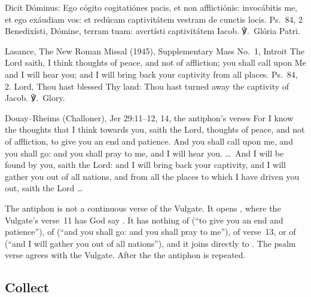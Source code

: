 
\begin{latinproper}
Dicit Dóminus: Ego cógito cogitatiónes pacis, et non afflictiónis:
invocábitis me, et ego exáudiam vos: et redúcam captivitátem vestram de
cunctis locis. \textnormal{Ps.\ 84, 2} Benedixísti, Dómine, terram tuam:
avertísti captivitátem Iacob. ℣.~Glória Patri.
\end{latinproper}

\begin{englishwitness}{Lasance, The New Roman Missal (1945), Supplementary Mass No.~1, Introit}
The Lord saith, I think thoughts of peace, and not of affliction; you shall
call upon Me and I will hear you; and I will bring back your captivity from
all places. Ps.~84, 2. Lord, Thou hast blessed Thy land: Thou hast turned away
the captivity of Jacob. ℣.~Glory.
\end{englishwitness}

\begin{englishwitness}{Douay--Rheims (Challoner), Jer 29:11--12, 14, the antiphon's verses}
For I know the thoughts that I think towards you, saith the Lord, thoughts of
peace, and not of affliction, to give you an end and patience. And you shall
call upon me, and you shall go: and you shall pray to me, and I will hear you.
\dots\ And I will be found by you, saith the Lord: and I will bring back your
captivity, and I will gather you out of all nations, and from all the places
to which I have driven you out, saith the Lord \dots
\end{englishwitness}

\noindent The antiphon is not a continuous verse of the Vulgate. It opens
, where the Vulgate's verse~11 has God say . It has nothing
of  (``to give you an end and
patience''), of  (``and you shall go: and you
shall pray to me''), of verse~13, or of  (``and I will gather you out of all nations''), and it joins
 directly to . The
psalm verse agrees with the Vulgate. After the  the
antiphon is repeated.

\subsection{Collect}
\label{proper-collect}

